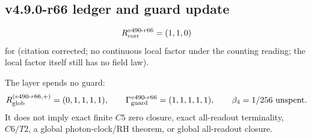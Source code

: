 \subsection*{v4.9.0-r66 ledger and guard update}
\label{subsec:v490-r66-ledger-guard}

\[
R_{\rm corr}^{v490\text{-}r66}=(1,1,0)
\]
for (citation corrected; no continuous local factor under the counting reading; the local factor itself still has no field law).

The layer spends no guard:
\[
R_{\rm glob}^{(v490\text{-}r66,+)}=(0,1,1,1,1),
\qquad
\Gamma_{\rm guard}^{v490\text{-}r66}=(1,1,1,1,1),
\qquad
\beta_4=1/256\ \text{unspent}.
\]
It does not imply exact finite \(C5\) zero closure, exact all-readout terminality,
\(C6/T2\), a global photon-clock/RH theorem, or global all-readout closure.
